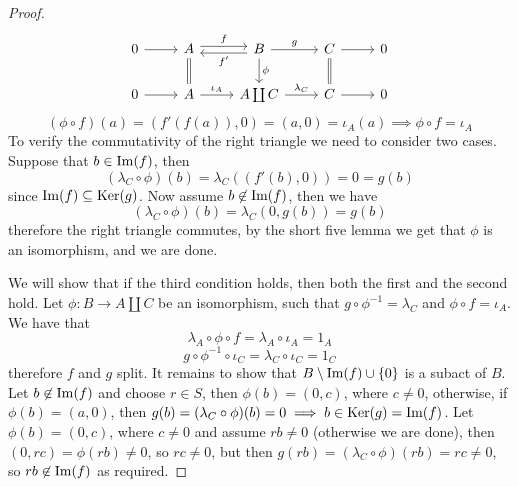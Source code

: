 \begin{proof}[Proof]
\[\begin{tikzcd}
        0 & A & B & C & 0 \\
        0 & A & {A\coprod C} & C & 0
        \arrow[from=1-1, to=1-2]
        \arrow["f", shift left, from=1-2, to=1-3]
        \arrow[equal, from=1-2, to=2-2]
        \arrow["{f'}", shift left, from=1-3, to=1-2]
        \arrow["g", from=1-3, to=1-4]
        \arrow["\phi", from=1-3, to=2-3]
        \arrow[from=1-4, to=1-5]
        \arrow[equal, from=1-4, to=2-4]
        \arrow[from=2-1, to=2-2]
        \arrow["{\iota_A}", from=2-2, to=2-3]
        \arrow["{\lambda_C}", from=2-3, to=2-4]
        \arrow[from=2-4, to=2-5]
    \end{tikzcd}\]
    \[
        (\phi\circ f)(a) = (f'(f(a)),0) = (a,0) = \iota_A(a) \implies \phi\circ f = \iota_A
    \]
    To verify the commutativity of the right triangle we need to consider two cases. Suppose that $b\in\mathrm{Im}(f)$, then 
    \[
        (\lambda_C\circ \phi)(b) = \lambda_C((f'(b),0)) = 0 = g(b)
    \]
    since $\mathrm{Im}(f)\subseteq\mathrm{Ker}(g)$. Now assume $b\not\in\mathrm{Im}(f)$, then we have 
    \[
        (\lambda_C\circ\phi)(b) = \lambda_C(0,g(b)) = g(b)
    \]
    therefore the right triangle commutes, by the short five lemma we get that $\phi$ is an isomorphism, and we are done.\par 
    We will show that if the third condition holds, then both the first and the second hold. Let $\phi: B \to A\coprod C$ be 
    an isomorphism, such that $g\circ\phi^{-1}=\lambda_C$ and $\phi\circ f = \iota_A$.
    We have that 
    \[
        \lambda_A \circ \phi \circ f = \lambda_A \circ \iota_A = 1_A
    \]
    \[
        g\circ \phi^{-1} \circ \iota_C = \lambda_C\circ\iota_C = 1_C
    \]
    therefore $f$ and $g$ split. It remains to show that $B\setminus\mathrm{Im}(f) \cup\{0\}$ is a subact of $B$. Let 
    $b\not\in\mathrm{Im}(f)$ and choose $r\in S$, then $\phi(b)=(0,c)$, where $c\neq 0$, otherwise, if 
    $\phi(b)=(a,0)$, then $g(b) = (\lambda_C\circ \phi)(b) = 0 \implies b\in\mathrm{Ker}(g)=\mathrm{Im}(f)$. Let $\phi(b)=(0,c)$, where 
    $c\neq 0$ and assume $rb\neq 0$ (otherwise we are done), then $(0,rc) = \phi(rb) \neq 0$, so $rc\neq 0$, but then 
    $g(rb) = (\lambda_C\circ\phi)(rb) = rc \neq 0$, so $rb\not\in\mathrm{Im}(f)$ as required.
\end{proof}
